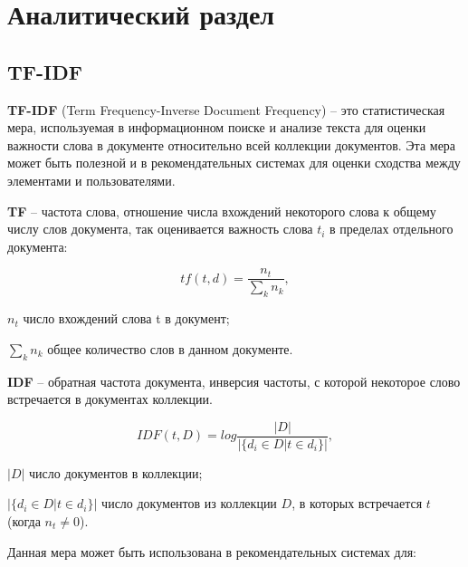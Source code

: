 \section{Аналитический раздел}

\subsection{TF-IDF}

\textbf{TF-IDF} (Term Frequency-Inverse Document Frequency) -- это статистическая мера, используемая в информационном поиске и анализе текста для оценки важности слова в документе относительно всей коллекции документов. Эта мера может быть полезной и в рекомендательных системах для оценки сходства между элементами и пользователями. \cite{tfidf}

\textbf{TF} -- частота слова, отношение числа вхождений некоторого слова к общему числу слов документа, так оценивается важность слова $t_i$ в пределах отдельного документа:

\begin{equation}
	tf(t, d) = \frac{n_t}{\sum_{k}{n_k}},
\end{equation}
\begin{eqexpl}[15mm]
\item{$n_t$} число вхождений слова t в документ;
\item{$\sum_{k}{n_k}$} общее количество слов в данном документе.
\end{eqexpl}

\textbf{IDF} -- обратная частота документа, инверсия частоты, с которой некоторое слово встречается в документах коллекции.

\begin{equation}
	IDF(t, D) = log \frac{|D|}{|\{d_i \in D | t \in d_i\}|},
\end{equation}
\begin{eqexpl}[15mm]
\item{$|D|$} число документов в коллекции;
\item{$|\{d_i \in D | t \in d_i\}|$} число документов из коллекции $D$, в которых встречается $t$ (когда $n_t \neq 0$).
\end{eqexpl}

Данная мера может быть использована в рекомендательных системах для:

